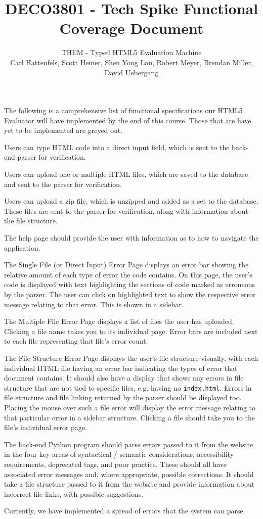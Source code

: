 \documentclass[10pt]{article}
\title{\bf \large DECO3801 - Tech Spike Functional Coverage Document}
\author{\normalsize THEM - Typed HTML5 Evaluation Machine \\ \normalsize Carl Hattenfels, Scott Heiner, Shen Yong Lau, Robert Meyer, Brendan Miller, David Uebergang}
\date{}
\begin{document}
\maketitle
The following is a comprehensive list of functional specifications our HTML5 Evaluator will have implemented by the end of this course. Those that are have yet to be implemented are greyed out.

\begin{itemize}
\item Users can type HTML code into a direct input field, which is sent to the back-end parser for verification.
\item Users can upload one or multiple HTML files, which are saved to the database and sent to the parser for verification.
\item Users can upload a zip file, which is unzipped and added as a set to the database. These files are sent to the parser for verification, {\color{gray} along with information about the file structure.}
{\color{gray}\item The help page should provide the user with information as to how to navigate the application.}
\item The Single File (or Direct Input) Error Page displays an error bar showing the relative amount of each type of error the code contains. On this page, the user's code is displayed with text highlighting the sections of code marked as erroneous by the parser.
The user can click on highlighted text to show the respective error message relating to that error. This is shown in a sidebar. %
\item The Multiple File Error Page displays a list of files the user has uploaded. Clicking a file name takes you to its individual page. {\color{gray} Error bars are included next to each file representing that file's error count.}
{\color{gray}\item The File Structure Error Page displays the user's file structure visually, with each individual HTML file having an error bar indicating the types of error that document contains. It should also have a display that shows any errors in file structure that are not tied to specific files, e.g. having no \verb'index.html'. Errors in file structure and file linking returned by the parser should be displayed too. Placing the mouse over such a file error will display the error message relating to that particular error in a sidebar structure. Clicking a file should take you to the file's individual error page.}
{\color{gray}\item The back-end Python program should parse errors passed to it from the website in the four key areas of syntactical / semantic considerations, accessibility requirements, deprecated tags, and poor practice. These should all have associated error messages and, where appropriate, possible corrections. It should take a file structure passed to it from the website and provide information about incorrect file links, with possible suggestions.} Currently, we have implemented a spread of errors that the system can parse.
\end{itemize}
\end{document}
